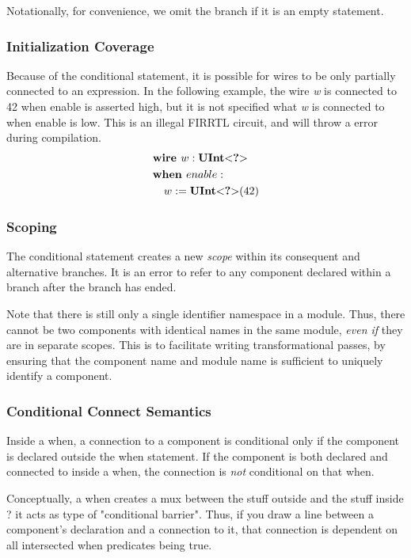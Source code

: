 \documentclass[12pt]{article}
\begin{document}
Notationally, for convenience, we omit the  branch if it is an empty statement. 

\subsubsection{Initialization Coverage}
Because of the conditional statement, it is possible for wires to be only partially connected to an expression.
In the following example, the wire {\em w} is connected to 42 when enable is asserted high, but it is not specified what {\em w} is connected to when enable is low.
This is an illegal FIRRTL circuit, and will throw a  error during compilation.
\[
\begin{aligned}
&\text{\bf wire\ } w : \text{\bf UInt}\text{\bf $<$} \text{\bf ?} \text{\bf $>$} \\
&\text{\bf when\ } enable : \\
&\quad w := \text{\bf UInt}\text{\bf $<$} \text{\bf ?} \text{\bf $>$}(42) \\
\end{aligned}
\]

\subsubsection{Scoping}
The conditional statement creates a new {\em scope} within its consequent and alternative branches.
It is an error to refer to any component declared within a branch after the branch has ended.

Note that there is still only a single identifier namespace in a module.
Thus, there cannot be two components with identical names in the same module, {\em even if} they are in separate scopes.
This is to facilitate writing transformational passes, by ensuring that the component name and module name is sufficient to uniquely identify a component.

\subsubsection{Conditional Connect Semantics}
Inside a when, a connection to a component is conditional only if the component is declared outside the when statement.
If the component is both declared and connected to inside a when, the connection is {\em not} conditional on that when.

Conceptually, a when creates a mux between the stuff outside and the stuff inside ? it acts as type of "conditional barrier".
Thus, if you draw a line between a component's declaration and a connection to it, that connection is dependent on all intersected when predicates being true.
\end{document}
